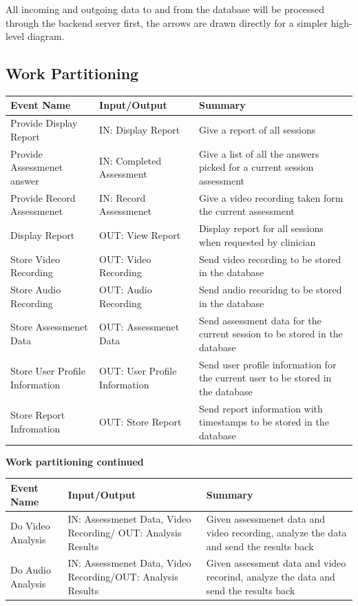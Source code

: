 \documentclass[12pt]{article}
\begin{document}
All incoming and outgoing data to and from the database will be processed through the backend server first, the arrows are drawn directly for a simpler high-level diagram. 
\subsection{Work Partitioning}
\begin{table}[H]
  \centering
  \begin{tabularx}{1.2\textwidth} { 
     >{\raggedright\arraybackslash}X 
    | >{\raggedright\arraybackslash}X 
    | >{\raggedright\arraybackslash}X  }
  \toprule
  \textbf{Event Name} & \textbf{Input/Output} & \textbf{Summary} \\
  \midrule
  Provide Display Report & IN: Display Report & Give a report of all sessions\\ 
  \midrule
  Provide Assessmenet answer & IN: Completed Assessment & Give a list of all the answers picked for a current session assessment \\ 
  \midrule
  Provide Record Assessmenet & IN: Record Assessmenet & Give a video recording taken form the current assessment \\ 
  \midrule
  Display Report & OUT: View Report  & Display report for all sessions when requested by clinician   \\ 
  \midrule
  Store Video Recording & OUT: Video Recording  & Send video recording to be stored in the database \\
  \midrule
  Store Audio Recording & OUT: Audio Recording  & Send audio recoridng to be stored in the database \\
  \midrule
  Store Assessmenet Data & OUT: Assessmenet Data  & Send assessment data for the current session to be stored in the database \\
  \midrule
  Store User Profile Information& OUT: User Profile Information  & Send user profile information for the current user to be stored in the database \\
  \midrule
  Store Report Infromation & OUT: Store Report  & Send report information with timestamps to be stored in the database \\
\bottomrule
\end{tabularx}
\end{table}
\newpage
\noindent \textbf{Work partitioning continued}
\begin{table}[H]
  \centering
  \begin{tabularx}{1.2\textwidth} { 
     >{\raggedright\arraybackslash}X 
    | >{\raggedright\arraybackslash}X 
    | >{\raggedright\arraybackslash}X  }
  \toprule
  \textbf{Event Name} & \textbf{Input/Output} & \textbf{Summary} \\
  \midrule
  Do Video Analysis & IN: Assessmenet Data, Video Recording/ OUT: Analysis Results  & Given assessmenet data and video recording, analyze the data and send the results back\\
  \midrule
  Do Audio Analysis & IN: Assessmenet Data, Video Recording/OUT: Analysis Results & Given assessment data and video recorind, analyze the data and send the results back \\
\bottomrule
\end{tabularx}
\end{table}
\end{document}
